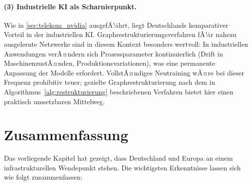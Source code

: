 ﻿\documentclass[12pt, a4paper, openany]{report}
\begin{document}
\paragraph{(3) Industrielle KI als Scharnierpunkt.}
Wie in \cref{sec:telekom_nvidia} ausgefÃ¼hrt, liegt Deutschlands
komparativer Vorteil in der industriellen KI. Graphrestrukturierungsverfahren
fÃ¼r nahezu ausgelernte Netzwerke sind in diesem Kontext besonders wertvoll:
In industriellen Anwendungen verÃ¤ndern sich Prozessparameter kontinuierlich
(Drift in MaschinenzustÃ¤nden, Produktionsvariationen), was eine
permanente Anpassung der Modelle erfordert. VollstÃ¤ndiges Neutraining wÃ¤re
bei dieser Frequenz prohibitiv teuer; gezielte Graphrestrukturierung
nach dem in Algorithmus~\ref{alg:restrukturierung} beschriebenen Verfahren
bietet hier einen praktisch umsetzbaren Mittelweg.

\section{Zusammenfassung}
\label{sec:ki_infrastruktur_zusammenfassung}

Das vorliegende Kapitel hat gezeigt, dass Deutschland und Europa an einem
infrastrukturellen Wendepunkt stehen. Die wichtigsten Erkenntnisse lassen
sich wie folgt zusammenfassen:
\end{document}
